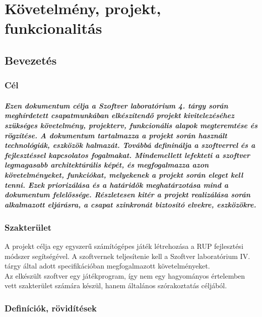 
\chapter{Követelmény, projekt, funkcionalitás}

\thispagestyle{fancy}

\section{Bevezetés}

\subsection{Cél}
\paragraph{Ezen dokumentum célja a Szoftver laboratórium 4. tárgy során meghírdetett csapatmunkában elkészítendő projekt kivitelezéséhez
szükséges követelmény, projekterv, funkcionális alapok megteremtése és rögzítése. A dokumentum tartalmazza a projekt során használt technológiák, eszközök
halmazát. Továbbá defininálja a szoftverrel és a fejlesztéssel kapcsolatos fogalmakat. Mindemellett lefekteti a szoftver legmagasabb architektúrális képét,
és megfogalmazza azon követelményeket, funkciókat, melyekenek a projekt során eleget kell tenni. Ezek priorizálása és a határidők meghatárzotása mind a dokumentum
felelőssége. Részletesen kitér a projekt realizálása során alkalmazott eljárásra, a csapat szinkronát biztosító elvekre, eszközökre.}

\subsection{Szakterület}
A projekt célja egy egyszerű számítógépes játék létrehozása a RUP fejlesztési módszer segítségével. A szoftvernek teljesítenie kell a Szoftver laboratórium IV. tárgy által adott specifikációban megfogalmazott követelményeket. \\ 
Az elkészült szoftver egy játékprogram, így nem egy hagyományos értelemben vett szakterület számára készül, hanem általános szórakoztatás céljából.

\subsection{Definíciók, rövidítések}


